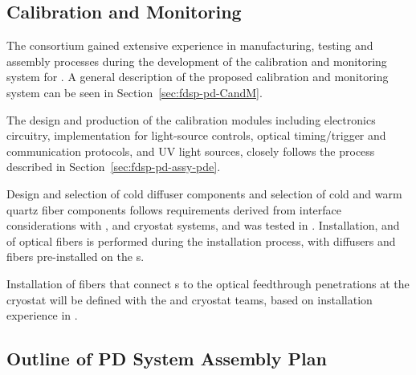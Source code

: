 \subsection{Calibration and Monitoring}
\label{sec:fdsp-pd-assy-CandM}

The consortium gained extensive experience in manufacturing, testing and assembly processes %
during the development of the calibration and monitoring system for .
A general description of the proposed calibration and monitoring system can be seen in  Section~\ref{sec:fdsp-pd-CandM}. 

The design and production of the calibration modules including electronics circuitry,   implementation for light-source controls, optical timing/trigger and  communication protocols, and UV light sources, closely follows the process described in Section~\ref{sec:fdsp-pd-assy-pde}.

Design and selection of cold diffuser components and selection of cold and warm quartz fiber components follows requirements derived from interface considerations with ,   and cryostat systems, %
and was tested in .
Installation,  and  of optical fibers is performed during the  installation process, with diffusers and  fibers pre-installed on the s.

Installation of fibers that connect s %
to the optical feedthrough penetrations at the cryostat will be defined with the  and cryostat teams, based on installation experience in . 

\subsection{Outline of PD System Assembly Plan}
\label{sec:fdsp-pd-assy-Assby-plan}



